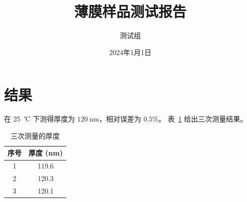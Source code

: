 \documentclass[UTF8,fontset=fandol]{ctexart}
\title{薄膜样品测试报告}
\author{测试组}
\date{2024年1月1日}
\begin{document}
\maketitle

\section{结果}
在 25~℃ 下测得厚度为 $120~\mathrm{nm}$，相对误差为 $0.5\%$。
表~\ref{tab:res} 给出三次测量结果。

\begin{table}[htbp]
  \centering
  \caption{三次测量的厚度}
  \label{tab:res}
  \begin{tabular}{cc}
    \toprule
    序号 & 厚度 (nm) \\
    \midrule
    1 & 119.6 \\
    2 & 120.3 \\
    3 & 120.1 \\
    \bottomrule
  \end{tabular}
\end{table}
\end{document}
